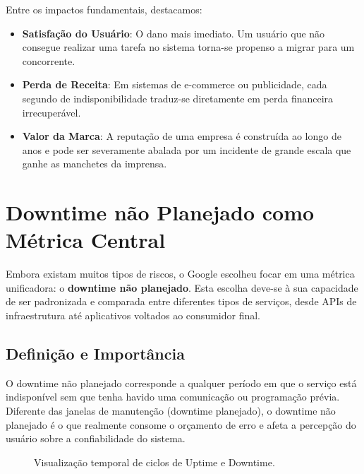 \documentclass[12pt,a4paper]{report}
\begin{document}
Entre os impactos fundamentais, destacamos:
\begin{itemize}
    \item \textbf{Satisfação do Usuário}: O dano mais imediato. Um usuário que não consegue realizar uma tarefa no sistema torna-se propenso a migrar para um concorrente.
    \item \textbf{Perda de Receita}: Em sistemas de e-commerce ou publicidade, cada segundo de indisponibilidade traduz-se diretamente em perda financeira irrecuperável.
    \item \textbf{Valor da Marca}: A reputação de uma empresa é construída ao longo de anos e pode ser severamente abalada por um incidente de grande escala que ganhe as manchetes da imprensa.
\end{itemize}

\section{Downtime não Planejado como Métrica Central}

Embora existam muitos tipos de riscos, o Google escolheu focar em uma métrica unificadora: o \textbf{downtime não planejado}. Esta escolha deve-se à sua capacidade de ser padronizada e comparada entre diferentes tipos de serviços, desde APIs de infraestrutura até aplicativos voltados ao consumidor final.

\subsection{Definição e Importância}

O downtime não planejado corresponde a qualquer período em que o serviço está indisponível sem que tenha havido uma comunicação ou programação prévia. Diferente das janelas de manutenção (downtime planejado), o downtime não planejado é o que realmente consome o orçamento de erro e afeta a percepção do usuário sobre a confiabilidade do sistema.

\begin{figure}[h]
    \centering
    \caption{Visualização temporal de ciclos de Uptime e Downtime.}
\end{figure}
\end{document}
